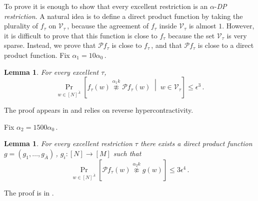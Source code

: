 \documentclass[11pt]{article}
\numberwithin{equation}{section}
\newtheorem{lemma}[theorem]{Lemma}
\theoremstyle{definition}
\theoremstyle{plain}
\newcommand{\Prob}[2][]{\Pr_{{#1}}\left[#2\right]} %
\newcommand{\brac}[1]{[#1]} %
\newcommand{\given}{\;\middle\vert\;} %
\newcommand\f{f} %
\newcommand{\g}{g} %
\newcommand\bh{\mathcal{P}\f_\tau} %
\newcommand\neqg[1]{\stackrel{{#1}}{ \not\approx}} %
\newcommand\cons{\mathcal{V}} %
\newcommand\rest[1]{{\bar{#1}}}  %
\begin{document}
To prove  it is enough to show that every excellent restriction is an $\alpha$-\emph{DP restriction}. A natural idea is to define a direct product function by taking the plurality of $f_\tau$ on $\cons_\tau$\,, because the agreement of $f_\tau$ inside $\cons_\tau$ is almost $1$. However, it is difficult to prove that this function is close to $f_\tau$ because the set $\cons_\tau$ is very sparse. Instead, we prove that $\bh$ is close to $\f_\tau$\,, and that $\bh$ is close to a direct product function. Fix $\alpha_1 = 10\alpha_0$\,.

\begin{lemma}\label{lem:local avg eq local}
	For every excellent $\tau$,
	\[\Prob[w\in\brac{N}^{\bar{A}}]{\f_{\tau}(w) \neqg{ \alpha_1 k} \bh(w)\given w\in\cons_\tau}\leq \epsilon^3\,.\]  %
\end{lemma} 
The proof appears in  and relies on reverse hypercontractivity. 

Fix $\alpha_2 = 1500\alpha_0$\,.
\begin{lemma}\label{lem:local avg product}
	For every excellent restriction $\tau$ there exists a direct product function $\g = (\g_1,\ldots, \g_{\rest{A}})$\,, $\g_i:[N]\rightarrow[M]$ such that
	\[\Prob[w\in\brac{N}^{\bar{A}}]{\bh(w)\neqg{\alpha_2 k}\g(w) }\leq 3\epsilon^{4}\,.\]  %
\end{lemma}
The proof is in .
	
\end{document}
